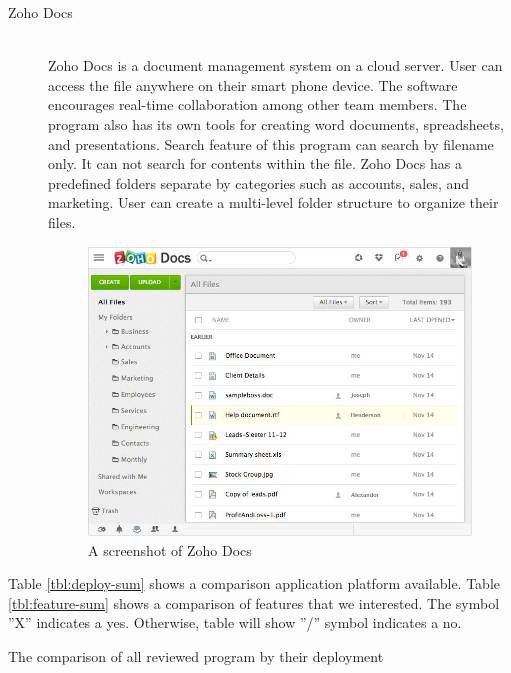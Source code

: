 \begin{description}
\item[Zoho Docs] \hfill \\
Zoho Docs is a document management system on a cloud server.
User can access the file anywhere on their smart phone device.
The software encourages real-time collaboration among other team members.
The program also has its own tools for creating word documents, spreadsheets, and presentations.
Search feature of this program can search by filename only.
It can not search for contents within the file.
Zoho Docs has a predefined folders separate by categories such as accounts, sales, and marketing.
User can create a multi-level folder structure to organize their files.
\begin{figure}[h]
	\centering
	\includegraphics[scale=0.55]{res/literature/screenshot_zoho}
	\caption{A screenshot of Zoho Docs }
\end{figure}
\end{description}

Table \ref{tbl:deploy-sum} shows a comparison application platform available.
Table \ref{tbl:feature-sum} shows a comparison of features that we interested.
The symbol ''X'' indicates a yes.
Otherwise, table will show ''/'' symbol indicates a no.

\clearpage

\begin{table}
	\centering
    
    \caption{The comparison of all reviewed program by their deployment}
    \label{tbl:deploy-sum}
\end{table}

